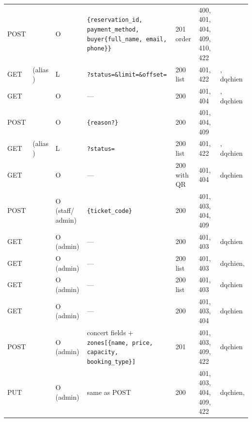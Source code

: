 \documentclass[11pt,a4paper]{article}
\newcommand{\code}[1]{\begingroup\let\codeus\_\renewcommand{\_}{\codeus\allowbreak}\texttt{#1}\endgroup}
\begin{document}
{\begin{xltabular}{\linewidth}{@{}l Y R{1.4cm} Y R{1.5cm} R{1.6cm} R{2.3cm}@{}}
POST   &                        & O   & \code{\{reservation\_id, payment\_method, buyer\{full\_name, email, phone\}\}} & 201 order & 400, 401, 404, 409, 410, 422 &  \\
GET    &  (alias ) & L & \code{?status=\&limit=\&offset=}      & 200 list  & 401, 422      & , dqchien \\
GET    &                     & O   & ---                                      & 200       & 401, 404      & , dqchien \\
POST   &              & O   & \code{\{reason?\}}                       & 200       & 401, 404, 409 &  \\
GET    &  (alias ) & L & \code{?status=}                     & 200 list  & 401, 422      & , dqchien \\
GET    &                    & O   & ---                                      & 200 with QR & 401, 404    & dqchien \\
POST   &                & O (staff/ admin) & \code{\{ticket\_code\}}      & 200       & 401, 403, 404, 409 &  \\
GET    &                     & O (admin) & ---                                & 200       & 401, 403      & dqchien \\
GET    &            & O (admin) & ---                                & 200 list  & 401, 403      & dqchien,  \\
GET    &                  & O (admin) & ---                                & 200 list  & 401, 403      & dqchien \\
GET    &             & O (admin) & ---                                & 200       & 401, 403, 404 & dqchien \\
POST   &                  & O (admin) & concert fields + \code{zones[\{name, price, capacity, booking\_type\}]} & 201 & 401, 403, 409, 422 & dqchien \\
PUT    &             & O (admin) & same as POST                       & 200       & 401, 403, 404, 409, 422 & dqchien,  \\

\end{xltabular}}
\end{document}
